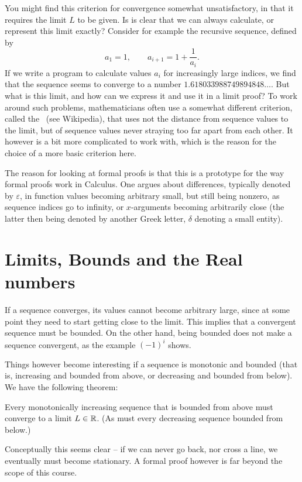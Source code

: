 \begin{note}
\label{cauchycrit}
You might find this criterion for convergence somewhat unsatisfactory, in
that it requires the limit $L$ to be given. Is is clear that we can always
calculate, or represent this limit exactly? Consider for example the
recursive sequence, defined by
\[
a_1=1,\qquad a_{i+1}=1+\frac{1}{a_i}.
\]
If we write a program to calculate values $a_i$ for increasingly large
indices, we find that the sequence seems to converge to a number
$1.618033988749894848\ldots$. But what is this limit, and how can we express it and use it in a limit proof?  To work
around such problems, mathematicians often use a somewhat different
criterion, called the~ (see Wikipedia), that uses
not the distance from sequence values to the limit, but of sequence values
never straying too far apart from each other. It however is a bit more
complicated to work with, which is the reason for the choice of a more basic
criterion here.
\end{note}

The reason for looking at formal proofs is that this is a prototype for the
way formal proofs work in Calculus. One argues about differences, typically denoted
by $\varepsilon$, in function values becoming arbitrary small, but still
being nonzero, as sequence indices go to infinity, or $x$-arguments becoming
arbitrarily close (the latter then being denoted by another Greek letter,
$\delta$ denoting a small entity).

\section{Limits, Bounds and the Real numbers}

If a sequence converges, its values cannot become arbitrary large, since at some point
they need to start getting close to the limit. This implies that a convergent sequence
must be bounded.
On the other hand, being bounded does not make a sequence
convergent, as the example $(-1)^i$ shows.

Things however become interesting if a sequence is monotonic and bounded (that is,
increasing and bounded from above, or decreasing and bounded from below). We have the
following theorem:
\begin{thm}
Every monotonically increasing sequence that is bounded from above must converge to a
limit $L\in{\mathbb R}$. (As must every decreasing sequence bounded from below.)
\end{thm}
Conceptually this seems clear -- if we can never go back, nor cross a line, we eventually
must become stationary. A formal proof however is far beyond the scope of this course.

